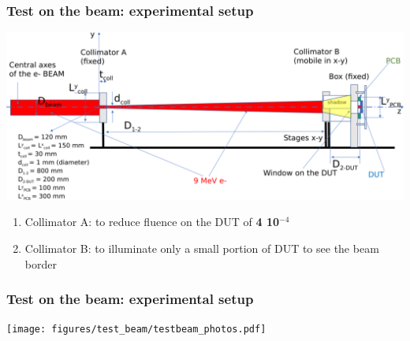     \begin{frame}
        \frametitle{Test on the beam: experimental setup}
        \smallskip
        \includegraphics[width=.95\linewidth]{figures/test_beam/Flash-beam-scheme.pdf}\\
        \smallskip
        \begin{enumerate}
            \item Collimator A: to reduce fluence on the DUT of \textbf{4 10$^{-4}$}
            \item Collimator B: to illuminate only a small portion of DUT to see the beam border
        \end{enumerate}
        
    \end{frame}    


    \begin{frame}
        \frametitle{Test on the beam: experimental setup}
        \centering
        \texttt{[image: figures/test\_beam/testbeam\_photos.pdf]}  
    \end{frame}    

